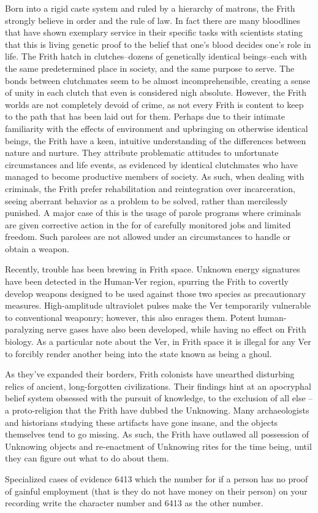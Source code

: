 \documentclass[blue]{guildcamp4}
\begin{document}
Born into a rigid caste system and ruled by a hierarchy of matrons, the Frith strongly believe in order and the rule of law. In fact there are many bloodlines that have shown exemplary service in their specific tasks with scientists stating that this is living genetic proof to the belief that one's blood decides one's role in life. The Frith hatch in clutches--dozens of genetically identical beings--each with the same predetermined place in society, and the same purpose to serve. The bonds between clutchmates seem to be almost incomprehensible, creating a sense of unity in each clutch that even is considered nigh absolute. However, the Frith worlds are not completely devoid of crime, as not every Frith is content to keep to the path that has been laid out for them. Perhaps due to their intimate familiarity with the effects of environment and upbringing on otherwise identical beings, the Frith have a keen, intuitive understanding of the differences between nature and nurture. They attribute problematic attitudes to unfortunate circumstances and life events, as evidenced by identical clutchmates who have managed to become productive members of society. As such, when dealing with criminals, the Frith prefer rehabilitation and reintegration over incarceration, seeing aberrant behavior as a problem to be solved, rather than mercilessly punished. A major case of this is the usage of parole programs where criminals are given corrective action in the for of carefully monitored jobs and limited freedom. Such parolees are not allowed under an circumstances to handle or obtain a weapon. 

Recently, trouble has been brewing in Frith space. Unknown energy signatures have been detected in the Human-Ver region, spurring the Frith to covertly develop weapons designed to be used against those two species as precautionary measures. High-amplitude ultraviolet pulses make the Ver temporarily vulnerable to conventional weaponry; however, this also enrages them. Potent human-paralyzing nerve gases have also been developed, while having no effect on Frith biology. As a particular note about the Ver, in Frith space it is illegal for any Ver to forcibly render another being into the state known as being a ghoul. 

As they've expanded their borders, Frith colonists have unearthed disturbing relics of ancient, long-forgotten civilizations. Their findings hint at an apocryphal belief system obsessed with the pursuit of knowledge, to the exclusion of all else -- a proto-religion that the Frith have dubbed the Unknowing. Many archaeologists and historians studying these artifacts have gone insane, and the objects themselves tend to go missing. As such, the Frith have outlawed all possession of Unknowing objects and re-enactment of Unknowing rites for the time being, until they can figure out what to do about them.






\begin{itemz}
	\item Specialized cases of evidence 6413 which the number for if a person has no proof of gainful employment (that is they do not have money on their person) on your recording write the character number and 6413 as the other number.

	
\end{itemz}
	
\end{document}
